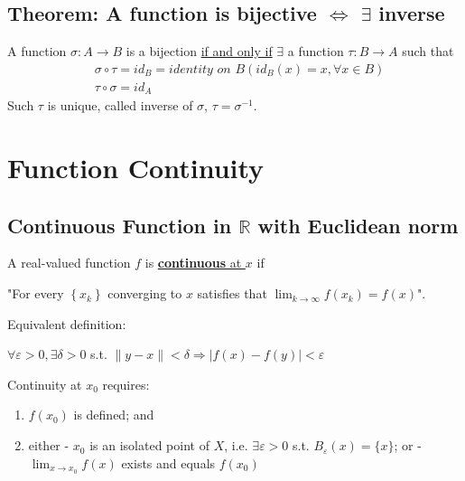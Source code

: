 \documentclass[11pt]{elegantbook}
\begin{document}
\subsection{Theorem: A function is bijective $\Leftrightarrow$ $\exists$ inverse}
\begin{theorem}
    A function $\sigma:A \rightarrow B$ is a bijection \underline{if and only if} $\exists$ a function $\tau:B \rightarrow A $ such that
    \begin{equation}
        \begin{aligned}
            &\sigma\circ\tau=id_B=\textit{identity on }B(id_B(x)=x, \forall x\in B)\\
            &\tau\circ\sigma=id_A
        \end{aligned}
        \nonumber
    \end{equation}
    Such $\tau$ is unique, called inverse of $\sigma$, $\tau=\sigma^{-1}$.
\end{theorem}

\section{Function Continuity}

\subsection{Continuous Function in $\mathbb{R}$ with Euclidean norm}
\begin{definition}
    \normalfont
    A real-valued function $f$ is \underline{\textbf{continuous} at $x$} if
    
    "For every $\left\{x_{k}\right\}$ converging to $x$ satisfies that $\lim _{k \rightarrow \infty} f\left(x_{k}\right)=f(x)$".

    Equivalent definition:

    $\forall \varepsilon>0, \exists \delta>0$ s.t.
    $\|y-x\|<\delta \Rightarrow |f(x)-f(y)|<\varepsilon$
\end{definition}
Continuity at $x_0$ requires:
\begin{enumerate}
    \item $f(x_0)$ is defined; and
    \item either
    \subitem - $x_0$ is an isolated point of $X$, i.e. $\exists \varepsilon > 0$ s.t. $B_\varepsilon(x) = \{x\}$; or
    \subitem - $\lim_{x \rightarrow x_0} f(x)$ exists and equals $f(x_0)$
\end{enumerate}
\end{document}
